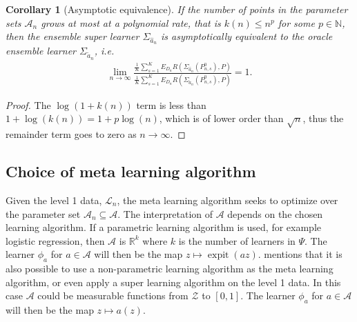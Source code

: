 \documentclass[11pt, a4paper]{article}
\newtheorem{corollary}[theorem]{Corollary}
\theoremstyle{definition}
\theoremstyle{remark}
\newcommand{\ml}{k}
\newcommand{\lib}{\Psi}
\newcommand{\lone}{\mathcal{L}}
\newcommand{\meta}{\phi}
\newcommand{\esl}{\Sigma}
\DeclareMathOperator{\expit}{expit}
\begin{document}
\begin{corollary}[Asymptotic equivalence] \label{cor:esl_asymptotic_equivalence}
    If the number of points in the parameter sets $ \mathcal{A}_n $ grows at most at a polynomial rate, that is $ k(n) \leq n^{p} $ for some $ p \in \mathbb{N} $, then the ensemble super learner $ \esl_{ \hat{a}_n } $ is asymptotically equivalent to the oracle ensemble learner $ \esl_{ \tilde{a}_n } $, i.e.
    \begin{align*}
        \lim_{n \to \infty} \frac{\frac{1}{K} \sum_{s = 1}^{K} E_{D_n} R(\esl_{ \hat{a}_n }(P_{n, s}^{0}) , P)}{\frac{1}{K} \sum_{s = 1}^{K} E_{D_n} R(\esl_{ \tilde{a}_n }(P_{n,s}^{0}), P)} = 1.
    \end{align*}
\end{corollary}
\begin{proof}
    The $ \log(1 + k(n)) $ term is less than $ 1 + \log(k(n)) = 1 + p \log(n) $, which is of lower order than $ \sqrt{n} $, thus the remainder term goes to zero as $ n \to \infty $.
\end{proof}

\subsection{Choice of meta learning algorithm} \label{simplex}
Given the level 1 data, $ \lone_n $, the meta learning algorithm seeks to optimize over the parameter set $ \mathcal{A}_n \subseteq \mathcal{A} $. The interpretation of $ \mathcal{A} $ depends on the chosen learning algorithm. If a parametric learning algorithm is used, for example logistic regression, then $ \mathcal{A} $ is $ \mathbb{R}^{\ml} $ where $ \ml $ is the number of learners in $ \lib $. The learner $ \meta_a $ for $ a \in \mathcal{A} $ will then be the map $ z \mapsto \expit(az) $.
\cite{van2007super} mentions that it is also possible to use a non-parametric learning algorithm as the meta learning algorithm, or even apply a super learning algorithm on the level 1 data. In this case $ \mathcal{A} $ could be measurable functions from $ \mathcal{Z} $ to $ [0, 1] $. The learner $ \meta_a $ for $ a \in \mathcal{A} $ will then be the map $ z \mapsto a(z) $.
\end{document}
